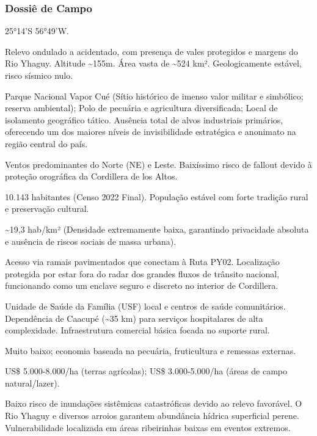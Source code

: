\subsubsection{Dossiê de Campo}
\begin{description}[style=nextline,leftmargin=0.5cm,font=\bfseries]
\item[Coordenadas]  25°14'S 56°49'W.
\item[Topografia]  Relevo ondulado a acidentado, com presença de vales protegidos e margens do Rio Yhaguy. Altitude \textasciitilde 155m. Área vasta de \textasciitilde 524 km². Geologicamente estável, risco sísmico nulo.
\item[Alvos Estratégicos]  Parque Nacional Vapor Cué (Sítio histórico de imenso valor militar e simbólico; reserva ambiental); Polo de pecuária e agricultura diversificada; Local de isolamento geográfico tático. Ausência total de alvos industriais primários, oferecendo um dos maiores níveis de invisibilidade estratégica e anonimato na região central do país.
\item[Fallout]  Ventos predominantes do Norte (NE) e Leste. Baixíssimo risco de fallout devido à proteção orográfica da Cordillera de los Altos.
\item[População]  10.143 habitantes (Censo 2022 Final). População estável com forte tradição rural e preservação cultural.
\item[Densidade]  \textasciitilde 19,3 hab/\allowbreak km² (Densidade extremamente baixa, garantindo privacidade absoluta e ausência de riscos sociais de massa urbana).
\item[Vias de Acesso]  Acesso via ramais pavimentados que conectam à Ruta PY02. Localização protegida por estar fora do radar dos grandes fluxos de trânsito nacional, funcionando como um enclave seguro e discreto no interior de Cordillera.
\item[Serviços]  Unidade de Saúde da Família (USF) local e centros de saúde comunitários. Dependência de Caacupé (\textasciitilde 35 km) para serviços hospitalares de alta complexidade. Infraestrutura comercial básica focada no suporte rural.
\item[Custo de Vida]  Muito baixo; economia baseada na pecuária, fruticultura e remessas externas.
\item[Preço da Terra]  US\$ 5.000-8.000/\allowbreak ha (terras agrícolas); US\$ 3.000-5.000/\allowbreak ha (áreas de campo natural/\allowbreak lazer).
\item[Hidrologia]  Baixo risco de inundações sistêmicas catastróficas devido ao relevo favorável. O Rio Yhaguy e diversos arroios garantem abundância hídrica superficial perene. Vulnerabilidade localizada em áreas ribeirinhas baixas em eventos extremos.

\end{description}
